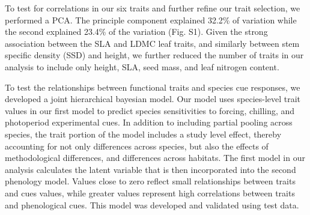 \documentclass{article}\usepackage[]{graphicx}\usepackage[]{color}
\begin{document}
To test for correlations in our six traits and further refine our trait selection, we performed a PCA. The principle component explained 32.2\% of variation while the second explained 23.4\% of the variation (Fig. S1). Given the strong association between the SLA and LDMC leaf traits, and similarly between stem specific density (SSD) and height, we further reduced the number of traits in our analysis to include only height, SLA, seed mass, and leaf nitrogen content. 

To test the relationships between functional traits and species cue responses, we developed a joint hierarchical bayesian model. Our model uses species-level trait values in our first model to predict species sensitivities to forcing, chilling, and photoperiod experimental cues. In addition to including partial pooling across species, the trait portion of the model includes a study level effect, thereby accounting for not only differences across species, but also the effects of methodological differences, and differences across habitats. The first model in our analysis calculates the latent variable that is then incorporated into the second phenology model. Values close to zero reflect small relationships between traits and cues values, while greater values represent high correlations between traits and phenological cues. This model was developed and validated using test data.
 
\end{document}
